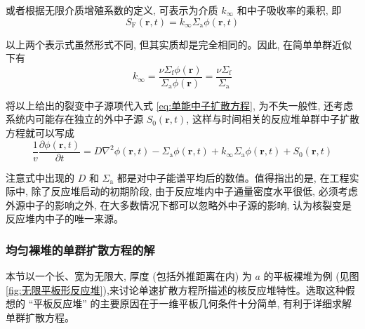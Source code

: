 \documentclass{Sichuan Normal University}
\begin{document}
或者根据无限介质增殖系数的定义, 可表示为介质 $k_{\infty}$ 和中子吸收率的乘积, 即
\begin{equation}
S_{\mathrm{F}}(\boldsymbol{r}, t)=k_{\infty} \Sigma_{\mathrm{a}} \phi(\boldsymbol{r}, t)
\end{equation}

以上两个表示式虽然形式不同, 但其实质却是完全相同的。因此, 在简单单群近似下有
\begin{equation}
k_{\infty}=\frac{\nu \Sigma_{\mathrm{f}} \phi(\boldsymbol{r})}{\Sigma_{\mathrm{a}} \phi(\boldsymbol{r})}=\frac{\nu \Sigma_{\mathrm{f}}}{\Sigma_{\mathrm{a}}}
\end{equation}

将以上给出的裂变中子源项代入式 \eqref{eq:单能中子扩散方程}, 为不失一般性, 还考虑系统内可能存在独立的外中子源 $S_0(\boldsymbol{r}, t)$, 这样与时间相关的反应堆单群中子扩散方程就可以写成
\begin{equation}
\frac{1}{v} \frac{\partial \phi(\boldsymbol{r}, t)}{\partial t}=D \nabla^2 \phi(\boldsymbol{r}, t)-\Sigma_{\mathrm{a}} \phi(\boldsymbol{r}, t)+k_{\infty} \Sigma_{\mathrm{a}} \phi(\boldsymbol{r}, t)+S_0(\boldsymbol{r}, t)
\label{eq:均匀裸堆的单群扩散方程42}
\end{equation}

注意式中出现的 $D$ 和 $\Sigma_{\mathrm{a}}$ 都是对中子能谱平均后的数值。值得指出的是, 在工程实际中, 除了反应堆启动的初期阶段, 由于反应堆内中子通量密度水平很低, 必须考虑外源中子的影响之外, 在大多数情况下都可以忽略外中子源的影响, 认为核裂变是反应堆内中子的唯一来源。

\subsubsection*{均匀裸堆的单群扩散方程的解} 
本节以一个长、宽为无限大, 厚度 (包括外推距离在内) 为 $a$ 的平板裸堆为例 (见图 \ref{fig:无限平板形反应堆}),来讨论单速扩散方程所描述的核反应堆特性。选取这种假想的 “平板反应堆” 的主要原因在于一维平板几何条件十分简单, 有利于详细求解单群扩散方程。
\end{document}
